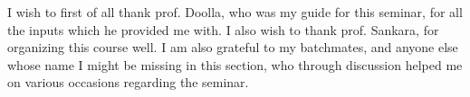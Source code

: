 \acknowledgments

I wish to first of all thank prof. Doolla, who was my guide for this seminar, for all the inputs which he provided me with.  I also wish to thank prof. Sankara, for organizing this course well. I am also grateful to my batchmates, and anyone else whose name I might be missing in this section, who through discussion helped me on various occasions regarding the seminar. 






\signature{\today}


